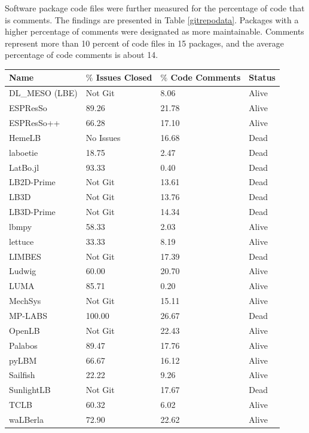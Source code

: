 \documentclass[12pt, notitlepage]{article}
\begin{document}
Software package code files were further measured for the percentage of code that is comments. The findings are presented in Table \ref{gitrepodata}. Packages with a higher percentage of comments were designated as more maintainable. Comments represent more than 10 percent of code files in 15 packages, and the average percentage of code comments is about 14.\\ 

\begin{onehalfspacing}
\begin{center}
	\begin{tabular}{ p{3.5cm}p{3.5cm}p{3.5cm}p{2.5cm} }
		\hline
		Name & $\%$ Issues Closed & $\%$ Code Comments& Status\\
		\hline
		DL\_MESO (LBE) & Not Git & 8.06&Alive\\
		ESPResSo & 89.26 & 21.78&Alive\\
		ESPResSo++ & 66.28 & 17.10&Alive\\
		HemeLB & No Issues & 16.68&Dead\\
		laboetie & 18.75 & 2.47&Dead\\		
		LatBo.jl & 93.33 & 0.40&Dead\\
		LB2D-Prime & Not Git & 13.61&Dead\\
		LB3D & Not Git & 13.76&Dead\\
		LB3D-Prime & Not Git & 14.34&Dead\\
		lbmpy& 58.33  & 2.03  &Alive\\
		lettuce & 33.33 & 8.19&Alive\\
		LIMBES & Not Git & 17.39&Dead\\
		Ludwig& 60.00 & 20.70&Alive\\
		LUMA& 85.71   & 0.20&Alive\\
		MechSys & Not Git & 15.11&Alive\\
		MP-LABS & 100.00 & 26.67&Dead\\
		OpenLB & Not Git & 22.43&Alive\\
		Palabos & 89.47 & 17.76&Alive\\
		pyLBM & 66.67& 16.12&Alive\\
		Sailfish & 22.22 & 9.26&Alive\\
		SunlightLB & Not Git & 17.67&Dead\\
		TCLB & 60.32 & 6.02&Alive\\
		waLBerla & 72.90 & 22.62&Alive\\
		\hline
	\end{tabular}
	\label{gitrepodata}
\end{center}
\end{onehalfspacing}
\end{document}
